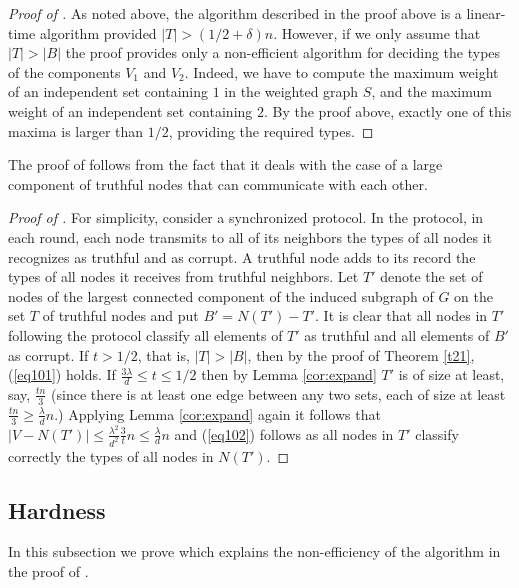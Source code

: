\documentclass{toc}
\begin{document}
\begin{proof}[Proof of ]
\noindent
As noted above,  %
the algorithm described in the proof above is a
linear-time algorithm provided $|T|>(1/2+\delta)n$.
However, if we only assume that $|T|>|B|$ the proof
provides only a non-efficient algorithm  for deciding the types of
the components $V_1$ and $V_2$. Indeed, we have to compute the
maximum weight of an independent set containing $1$
in the weighted graph $S$,
and the maximum weight of an independent set 
containing $2$. By the proof above, exactly one of this maxima 
is larger than $1/2$, providing the required types. 
%
\end{proof}    %

\bigskip
The proof of  follows from 
the fact that it deals with the case of a large component 
of truthful nodes that can communicate with each other. 

%
%
%
\begin{proof}[Proof of ]
%
For simplicity, consider a synchronized protocol. In the protocol, 
in each round, each node transmits to all of its
neighbors the  %
%
types  %
of all nodes it recognizes as truthful and as corrupt.  
A truthful node adds to its record 
the types of all nodes it receives from truthful neighbors. Let
$T'$ denote the set of nodes of the 
largest connected component of the induced 
subgraph of $G$ on the set $T$ of truthful nodes and
put $B'=N(T')-T'$. 
It is clear that all nodes in $T'$ following the protocol
classify all elements of $T'$ as truthful and all elements 
of $B'$ as corrupt. 
If $t >1/2$, that is,
$|T| > |B|$, then by the proof of Theorem \ref{t21}, 
(\ref{eq101}) holds.  If $\frac{3\lambda}{d} \leq t \leq 1/2$
then by Lemma \ref{cor:expand} $T'$ is of size  at least, say,
$\frac{tn}{3}$ (since there is at least one edge
between any two sets, each of size at least $\frac{tn}{3} \geq 
\frac{\lambda}{d}n$.)
Applying Lemma \ref{cor:expand} again it follows that
$|V-N(T')| \leq \frac{\lambda^2}{d^2}\frac{3}{t}n \leq
\frac{\lambda}{d} n$ and (\ref{eq102}) follows as all nodes  in
$T'$ classify correctly the types of all nodes in $N(T')$. 
\end{proof} 

\subsection{Hardness} \label{subsec:hardness}

In this subsection we prove  which explains 
the non-efficiency of the algorithm in the proof of .
\vspace{0.2cm}
\end{document}
